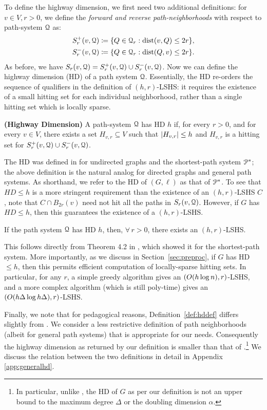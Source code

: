 To define the highway dimension, we first need two additional definitions:
for $v\in V, r>0$, we define the \emph{forward and reverse path-neighborhoods} with respect to path-system $\mathcal{Q}$ as: 
\begin{align*}
S_r^+(v,\calQ) &\defeq\crl*{Q\in\calQ_r: \dist(v,Q)\leq 2r}, \\  
S_r^-(v,\calQ) &\defeq\crl*{Q\in\calQ_r: \dist(Q,v)\leq 2r}.
\end{align*}
As before, we have $S_r(v,\mathcal{Q}) = S_r^+(v,\mathcal{Q})\cup S_r^-(v,\mathcal{Q})$. Now we can define the highway dimension (HD) of a path system $\mathcal{Q}$. Essentially, the HD re-orders the sequence of qualifiers in the definition of $(h,r)$-LSHS: it requires the existence of a small hitting set for each individual neighborhood, rather than a single hitting set which is locally sparse. 
\begin{definition}
\label{def:hddef}
\textbf{(Highway Dimension)}
A path-system $\mathcal{Q}$ has HD $h$ if, for every $r>0$, and for every $v\in V$, there exists a set $H_{v,r}\subseteq V$ such that $\lvert H_{v,r}\rvert\leq h$ and $H_{v,r}$ is a hitting set for $S_r^+(v,\mathcal{Q})\cup S_r^-(v,\mathcal{Q})$.
\end{definition}
The HD was defined in \cite{highway2013} for undirected graphs and the shortest-path system $\mathcal{P}^*$; the above definition is the natural analog for directed graphs and general path systems.
As shorthand, we refer to the HD of $(G,\ell)$ as that of $\mathcal{P}^*$. 
To see that $HD\leq h$ is a more stringent requirement than the existence of an $(h,r)$-LSHS $C$, note that $C\cap B_{2r}(v)$ need not hit all the paths in $S_r(v,\mathcal{Q})$. 
However, if $G$ has $HD\leq h$, then this guarantees the existence of a $(h,r)$-LSHS.
\begin{proposition}
If the path system $\mathcal{Q}$ has HD $h$, then, $\forall\,r>0$, there exists an $(h,r)$-LSHS.
\end{proposition}
This follows directly from Theorem 4.2 in \cite{highway2013}, which showed it for the shortest-path system. More importantly, as we discuss in Section~\ref{sec:preproc}, if $G$ has HD$\leq h$, then this permits efficient computation of locally-sparse hitting sets.
In particular, for any $r$, a simple greedy algorithm gives an $(O(h\log n),r)$-LSHS, and a more complex algorithm (which is still poly-time) gives an $(O(h\Delta\log h\Delta),r)$-LSHS.


Finally, we note that for pedagogical reasons, Definition~\ref{def:hddef} differs slightly from \cite{highway2013}.
We consider a less restrictive definition of path neighborhoods (albeit for general path systems) that is appropriate for our needs. Consequently the highway dimension as returned by our definition is smaller than that of \cite{highway2013}.\footnote{In particular, unlike \cite{highway2013}, the HD of $G$ as per our definition is not an upper bound to the maximum degree $\Delta$ or the doubling dimension $\alpha$.}
We discuss the relation between the two definitions in detail in Appendix \ref{app:generalhd}. 

